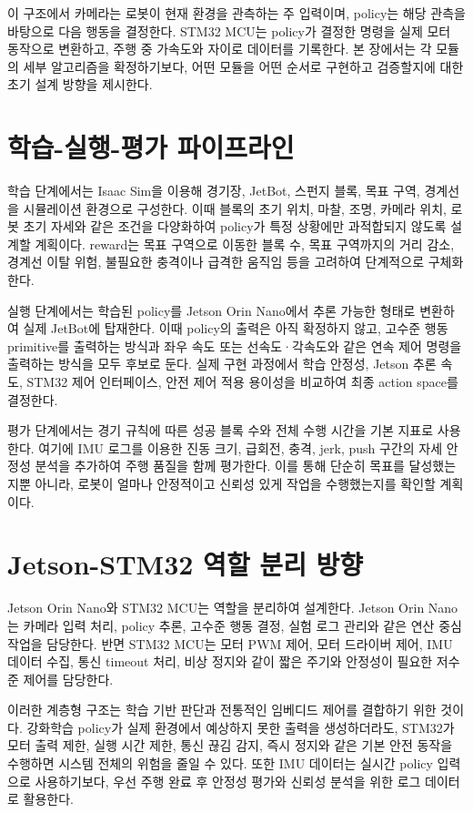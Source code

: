 \documentclass[titlepage]{pnureport}
\begin{document}
이 구조에서 카메라는 로봇이 현재 환경을 관측하는 주 입력이며, policy는 해당 관측을 바탕으로 다음 행동을 결정한다. STM32 MCU는 policy가 결정한 명령을 실제 모터 동작으로 변환하고, 주행 중 가속도와 자이로 데이터를 기록한다. 본 장에서는 각 모듈의 세부 알고리즘을 확정하기보다, 어떤 모듈을 어떤 순서로 구현하고 검증할지에 대한 초기 설계 방향을 제시한다.

\section{학습-실행-평가 파이프라인}

학습 단계에서는 Isaac Sim을 이용해 경기장, JetBot, 스펀지 블록, 목표 구역, 경계선을 시뮬레이션 환경으로 구성한다. 이때 블록의 초기 위치, 마찰, 조명, 카메라 위치, 로봇 초기 자세와 같은 조건을 다양화하여 policy가 특정 상황에만 과적합되지 않도록 설계할 계획이다. reward는 목표 구역으로 이동한 블록 수, 목표 구역까지의 거리 감소, 경계선 이탈 위험, 불필요한 충격이나 급격한 움직임 등을 고려하여 단계적으로 구체화한다.

실행 단계에서는 학습된 policy를 Jetson Orin Nano에서 추론 가능한 형태로 변환하여 실제 JetBot에 탑재한다. 이때 policy의 출력은 아직 확정하지 않고, 고수준 행동 primitive를 출력하는 방식과 좌우 속도 또는 선속도·각속도와 같은 연속 제어 명령을 출력하는 방식을 모두 후보로 둔다. 실제 구현 과정에서 학습 안정성, Jetson 추론 속도, STM32 제어 인터페이스, 안전 제어 적용 용이성을 비교하여 최종 action space를 결정한다.

평가 단계에서는 경기 규칙에 따른 성공 블록 수와 전체 수행 시간을 기본 지표로 사용한다. 여기에 IMU 로그를 이용한 진동 크기, 급회전, 충격, jerk, push 구간의 자세 안정성 분석을 추가하여 주행 품질을 함께 평가한다. 이를 통해 단순히 목표를 달성했는지뿐 아니라, 로봇이 얼마나 안정적이고 신뢰성 있게 작업을 수행했는지를 확인할 계획이다.

\section{Jetson-STM32 역할 분리 방향}

Jetson Orin Nano와 STM32 MCU는 역할을 분리하여 설계한다. Jetson Orin Nano는 카메라 입력 처리, policy 추론, 고수준 행동 결정, 실험 로그 관리와 같은 연산 중심 작업을 담당한다. 반면 STM32 MCU는 모터 PWM 제어, 모터 드라이버 제어, IMU 데이터 수집, 통신 timeout 처리, 비상 정지와 같이 짧은 주기와 안정성이 필요한 저수준 제어를 담당한다.

이러한 계층형 구조는 학습 기반 판단과 전통적인 임베디드 제어를 결합하기 위한 것이다. 강화학습 policy가 실제 환경에서 예상하지 못한 출력을 생성하더라도, STM32가 모터 출력 제한, 실행 시간 제한, 통신 끊김 감지, 즉시 정지와 같은 기본 안전 동작을 수행하면 시스템 전체의 위험을 줄일 수 있다. 또한 IMU 데이터는 실시간 policy 입력으로 사용하기보다, 우선 주행 완료 후 안정성 평가와 신뢰성 분석을 위한 로그 데이터로 활용한다.
\end{document}
